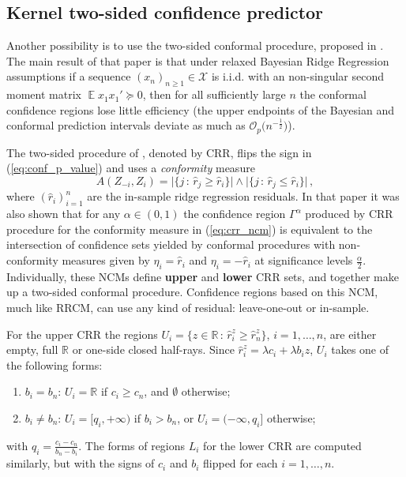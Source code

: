 \documentclass[10pt, conference, compsocconf]{IEEEtran}
\newcommand{\ex}{\mathop{\mathbb{E}}\nolimits}
\newcommand{\Xcal}{\mathcal{X}}
\newcommand{\Real}{\mathbb{R}}
\begin{document}

\subsection{Kernel two-sided confidence predictor} %
\label{sub:kernel_crr}

Another possibility is to use the two-sided conformal procedure, proposed in \cite{burnaevV14}.
The main result of that paper is that under relaxed Bayesian Ridge Regression assumptions
if a sequence $(x_n)_{n\geq1}\in\Xcal$ is i.i.d. with an non-singular second moment
matrix $\ex x_1x_1' \succeq 0$, then for all sufficiently large $n$ the conformal
confidence regions lose little efficiency (the upper endpoints of the Bayesian and
conformal prediction intervals deviate as much as $\mathcal{O}_p\bigl(n^{-\frac{1}{2}}\bigr)$).

The two-sided procedure of \cite{burnaevV14}, denoted by CRR, flips the sign
in (\ref{eq:conf_p_value}) and uses a \emph{conformity} measure
\begin{equation} \label{eq:crr_ncm}
  A(Z_{-i}, Z_i)
    = \bigl\lvert\{j\,:\, \hat{r}_j \geq \hat{r}_i \} \bigr\rvert \wedge
       \bigl\lvert\{j\,:\, \hat{r}_j \leq \hat{r}_i \} \bigr\rvert \,,
\end{equation}
where $(\hat{r}_i)_{i=1}^n$ are the in-sample ridge regression residuals.
In that paper it was also shown that for any $\alpha \in (0,1)$ the confidence
region $\Gamma^\alpha$ produced by CRR procedure for the conformity measure in
(\ref{eq:crr_ncm}) is equivalent to the intersection of confidence sets yielded
by conformal procedures with non-conformity measures given by $\eta_i = \hat{r}_i$
and $\eta_i = -\hat{r}_i$ at significance levels $\frac{\alpha}{2}$. Individually,
these NCMs define \textbf{upper} and \textbf{lower} CRR sets, and together make up
a two-sided conformal procedure. Confidence regions based on this NCM, much like
RRCM, can use any kind of residual: leave-one-out or in-sample.

For the upper CRR the regions $U_i = \{z\in\Real\,:\, \hat{r}_i^z \geq \hat{r}_n^z\}$,
$i=1,\ldots, n$, are either empty, full $\Real$ or one-side closed half-rays. Since
$\hat{r}_i^z = \lambda c_i + \lambda b_i z$, $U_i$ takes one of the following forms:
\begin{enumerate}
  \item $b_i=b_n$: $U_i = \Real$ if $c_i\geq c_n$, and $\emptyset$ otherwise;
  \item $b_i\neq b_n$: $U_i = [q_i, +\infty)$ if $b_i>b_n$, or
  $U_i = (-\infty, q_i]$ otherwise;
\end{enumerate}
with $q_i = \frac{c_i-c_n}{b_n-b_i}$. The forms of regions $L_i$ for the lower CRR
are computed similarly, but with the signs of $c_i$ and $b_i$ flipped for each $i=1, \ldots, n$.
\end{document}
